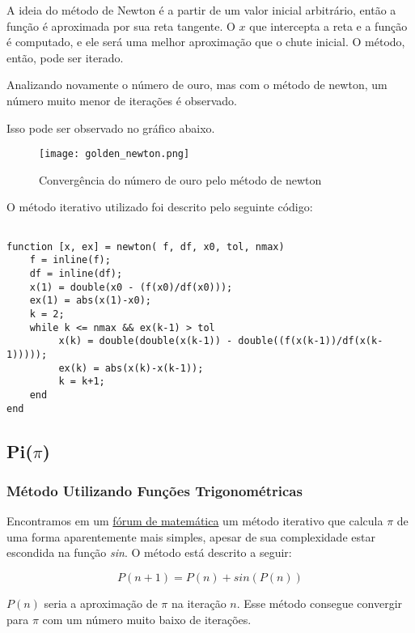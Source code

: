 A ideia do método de Newton é a partir de um valor inicial arbitrário, então a
função é aproximada por sua reta tangente. O $x$ que intercepta a reta e a
função é computado, e ele será uma melhor aproximação que o chute inicial. O
método, então, pode ser iterado.

Analizando novamente o número de ouro, mas com o método de newton, um número
muito menor de iterações é observado.



Isso pode ser observado no gráfico abaixo.

\begin{figure}[H]
    \centering
    \texttt{[image: golden\_newton.png]}
    \caption{Convergência do número de ouro pelo método de newton}
    \label{golden_newton}
\end{figure}

O método iterativo utilizado foi descrito pelo seguinte código:

\begin{lstlisting}

function [x, ex] = newton( f, df, x0, tol, nmax)
	f = inline(f);
	df = inline(df);
	x(1) = double(x0 - (f(x0)/df(x0)));
	ex(1) = abs(x(1)-x0);
	k = 2;
	while k <= nmax && ex(k-1) > tol
		 x(k) = double(double(x(k-1)) - double((f(x(k-1))/df(x(k-1)))));
		 ex(k) = abs(x(k)-x(k-1));
		 k = k+1;
	end
end

\end{lstlisting}

\subsection{Pi($\pi$)}

\subsubsection{Método Utilizando Funções Trigonométricas}

Encontramos em um
\href{http://mathforum.org/library/drmath/view/65244.html}{fórum de matemática}
um método iterativo que calcula $ \pi $ de uma forma aparentemente mais simples,
apesar de sua complexidade estar escondida na função \emph{sin}. O método está
descrito a seguir:

\begin{equation}
\label{magic_equation}
P(n+1) = P(n) + sin(P(n))
\end{equation}

$P(n)$ seria a aproximação de $\pi$ na iteração $n$. Esse método consegue
convergir para $\pi$ com um número muito baixo de iterações.

